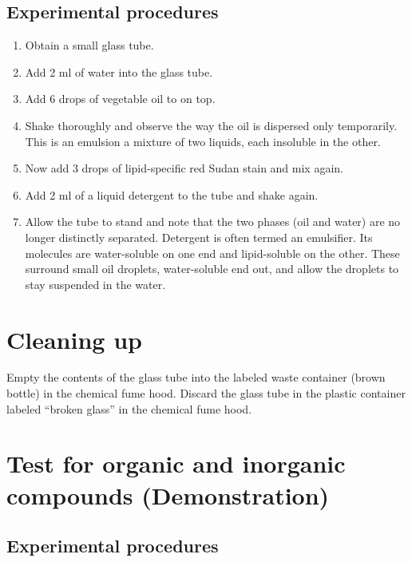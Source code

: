 \subsection{Experimental procedures}\label{experimental-procedures-4}

\begin{enumerate}
\def\labelenumi{\arabic{enumi}.}
\tightlist
\item
  Obtain a small glass tube.
\item
  Add 2 ml of water into the glass tube.
\item
  Add 6 drops of vegetable oil to on top.
\item
  Shake thoroughly and observe the way the oil is dispersed only
  temporarily. This is an emulsion a mixture of two liquids, each
  insoluble in the other.
\item
  Now add 3 drops of lipid-specific red Sudan stain and mix again.
\item
  Add 2 ml of a liquid detergent to the tube and shake again.
\item
  Allow the tube to stand and note that the two phases (oil and water)
  are no longer distinctly separated. Detergent is often termed an
  emulsifier. Its molecules are water-soluble on one end and
  lipid-soluble on the other. These surround small oil droplets,
  water-soluble end out, and allow the droplets to stay suspended in the
  water.
\end{enumerate}

\section{Cleaning up}\label{cleaning-up-1}

Empty the contents of the glass tube into the labeled waste container
(brown bottle) in the chemical fume hood. Discard the glass tube in the
plastic container labeled ``broken glass'' in the chemical fume hood.

\section{Test for organic and inorganic compounds
(Demonstration)}\label{test-for-organic-and-inorganic-compounds-demonstration}

\subsection{Experimental procedures}\label{experimental-procedures-5}

